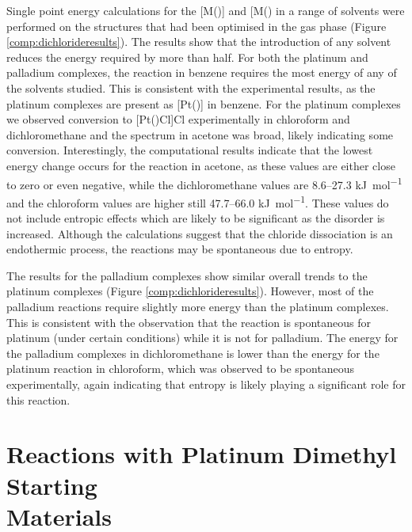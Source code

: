 Single point energy calculations for the [M(\tBuxantphos)] and [M(\tBuxantphosk)\ce{Cl]^{+}} in a range of solvents were performed on the structures that had been optimised in the gas phase (Figure \ref{comp:dichlorideresults}).  The results show that the introduction of any solvent reduces the energy required by more than half.  For both the platinum and palladium complexes, the reaction in benzene requires the most energy of any of the solvents studied.  This is consistent with the experimental results, as the platinum complexes are present as [Pt(\tBuxantphos)] in benzene.  For the platinum complexes we observed conversion to [Pt(\tBuxantphosk)Cl]Cl experimentally in chloroform and dichloromethane and the spectrum in acetone was broad, likely indicating some conversion.  Interestingly, the computational results indicate that the lowest energy change occurs for the reaction in acetone, as these values are either close to zero or even negative, while the dichloromethane values are 8.6--27.3 \si{\kilo\joule\per\mole} and the chloroform values are higher still 47.7--66.0 \si{\kilo\joule\per\mole}.  These values do not include entropic effects which are likely to be significant as the disorder is increased.  Although the calculations suggest that the chloride dissociation is an endothermic process, the reactions may be spontaneous due to entropy.  

The results for the palladium complexes show similar overall trends to the platinum complexes (Figure \ref{comp:dichlorideresults}).  However, most of the palladium reactions require slightly more energy than the platinum complexes.  This is consistent with the observation that the reaction is spontaneous for platinum (under certain conditions) while it is not for palladium.  The energy for the palladium complexes in dichloromethane is lower than the energy for the platinum reaction in chloroform, which was observed to be spontaneous experimentally, again indicating that entropy is likely playing a significant role for this reaction.   


\section[Reactions with Platinum Dimethyl Starting Materials]{Reactions with Platinum Dimethyl Starting\\Materials}

